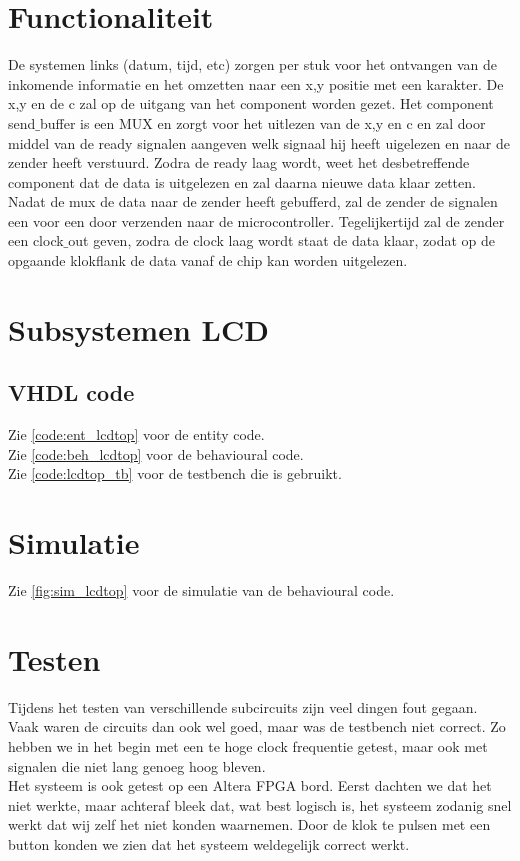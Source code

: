 \section{Functionaliteit}
De systemen links (datum, tijd, etc)  zorgen per stuk voor het ontvangen van de inkomende informatie en het omzetten naar een x,y positie met een karakter. De x,y en de c zal op de uitgang van het component worden gezet. 
Het component send$\_$buffer is een MUX en zorgt voor het uitlezen van de x,y en c en zal door middel van de ready signalen aangeven welk signaal hij heeft uigelezen en naar de zender heeft verstuurd. Zodra de ready laag wordt, weet het desbetreffende component dat de data is uitgelezen en zal daarna nieuwe data klaar zetten. 
Nadat de mux de data naar de zender heeft gebufferd, zal de zender de signalen een voor een door  verzenden naar de microcontroller. Tegelijkertijd zal de zender een clock$\_$out geven, zodra de clock laag wordt staat de data klaar, zodat op de opgaande klokflank de data vanaf de chip kan worden uitgelezen. 

\section{Subsystemen LCD}








\subsection{VHDL code}
Zie \ref{code:ent_lcdtop} voor de entity code. \\
Zie \ref{code:beh_lcdtop} voor de behavioural code.\\
Zie \ref{code:lcdtop_tb} voor de testbench die is gebruikt.

\section{Simulatie}
Zie \ref{fig:sim_lcdtop} voor de simulatie van de behavioural code. \\

\section{Testen}
Tijdens het testen van verschillende subcircuits zijn veel dingen fout gegaan. Vaak waren de circuits dan ook wel goed, maar was de testbench niet correct. Zo hebben we in het begin met een te hoge clock frequentie getest, maar ook met signalen die niet lang genoeg hoog bleven. \\
Het systeem is ook getest op een Altera FPGA bord. Eerst dachten we dat het niet werkte, maar achteraf bleek dat, wat best logisch is,  het systeem zodanig snel werkt dat wij zelf het niet konden waarnemen. Door de klok te pulsen met een button konden we zien dat het systeem weldegelijk correct werkt.

